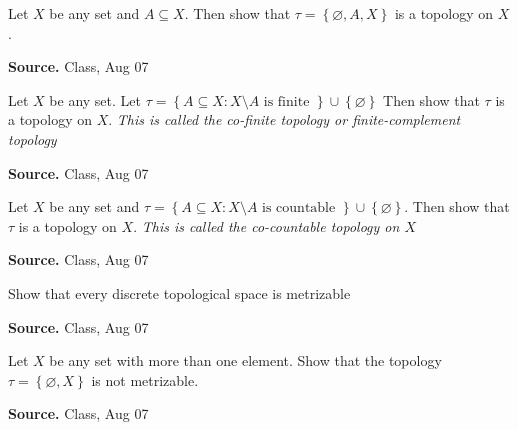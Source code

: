 \documentclass[12pt,twoside]{report}
\newenvironment*{source}{\hfill\scriptsize\textbf{Source.}\space}{\par}
\begin{document}
\begin{samepage}
\begin{ex}
Let $X$ be any set and $A \subseteq X$. Then show that 
$\tau = \left\{ \varnothing, A , X \right\}$ is a topology on $X$.
\end{ex}
\begin{source}
Class, Aug 07
\end{source}
\end{samepage}

\begin{samepage}
\begin{ex}
Let $X$ be any set. Let 
$\tau = \left\{ A \subseteq X  :  X \setminus A \text{ is finite } \right\} \cup \left\{ \varnothing \right\} $
Then show that $\tau$ is a topology on $X$.
\vspace{0.5cm}
\textit{This is called the co-finite topology or finite-complement topology}
\end{ex}
\begin{source}
Class, Aug 07
\end{source}
\end{samepage}

\begin{samepage}
\begin{ex}
Let $X$ be any set and 
$\tau = \left\{ A \subseteq X  :  X \setminus A \text{ is countable } \right\} \cup \left\{ \varnothing \right\} $.
Then show that $\tau$ is a topology on $X$.
\vspace{0.5cm}
\textit{This is called the co-countable topology on $X$}
\end{ex}
\begin{source}
Class, Aug 07
\end{source}
\end{samepage}

\begin{samepage}
\begin{ex}
Show that every discrete topological space is metrizable
\end{ex}
\begin{source}
Class, Aug 07
\end{source}
\end{samepage}

\begin{samepage}
\begin{ex}
Let $X$ be any set with more than one element. 
Show that the topology $\tau = \left\{ \varnothing, X \right\}$ is not metrizable.
\end{ex}
\begin{source}
Class, Aug 07
\end{source}
\end{samepage}
\end{document}
